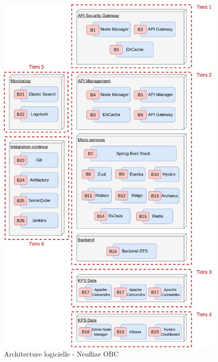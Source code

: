 
\begin{figure}[H]
\raggedleft
	\includegraphics[scale=0.45]{images/travailNeuflizeOBC/architecture/architectureLogicielle.png}
	\centering
	\caption{Architecture logicielle - Neuflize OBC}
	\label{archiLog}
\end{figure}